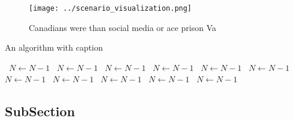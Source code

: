 \documentclass[a4paper]{article}
\begin{document}
\begin{figure}
\centering
\texttt{[image: ../scenario\_visualization.png]}
\caption{Canadians were than social media or ace prison Va
}
\end{figure}
 
\begin{algorithm}
\caption{An algorithm with caption}
\begin{algorithmic}
\    \State $N \gets N - 1$
\    \State $N \gets N - 1$
\    \State $N \gets N - 1$
\    \State $N \gets N - 1$
\    \State $N \gets N - 1$
\    \State $N \gets N - 1$
\    \State $N \gets N - 1$
\    \State $N \gets N - 1$
\    \State $N \gets N - 1$
\    \State $N \gets N - 1$
\    \State $N \gets N - 1$
\EndWhile
\end{algorithmic}
\end{algorithm}

\subsection{SubSection}
\end{document}
